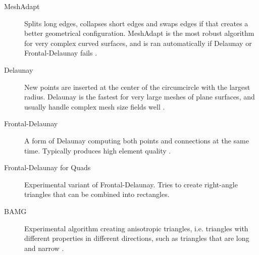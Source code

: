 \begin{description}
    \item[MeshAdapt] Splits long edges, collapses short edges and swaps edges if that creates a better geometrical configuration. MeshAdapt is the most robust algorithm for very complex curved surfaces, and is ran automatically if Delaunay or Frontal-Delaunay fails \cite{Gmsh_reference}.
    \item[Delaunay] New points are inserted at the center of the circumcircle with the largest radius. Delaunay is the fastest for very large meshes of plane surfaces, and usually handle complex mesh size fields well \cite{Gmsh_reference}.
    \item[Frontal-Delaunay] A form of Delaunay computing both points and connections at the same time. Typically produces high element quality \cite{Gmsh_reference}.
    \item[Frontal-Delaunay for Quads] Experimental variant of Frontal-Delaunay. Tries to create right-angle triangles that can be combined into rectangles.
    \item[BAMG] Experimental algorithm creating anisotropic triangles, i.e. triangles with different properties in different directions, such as triangles that are long and narrow \cite{Gmsh_reference}.
\end{description}

